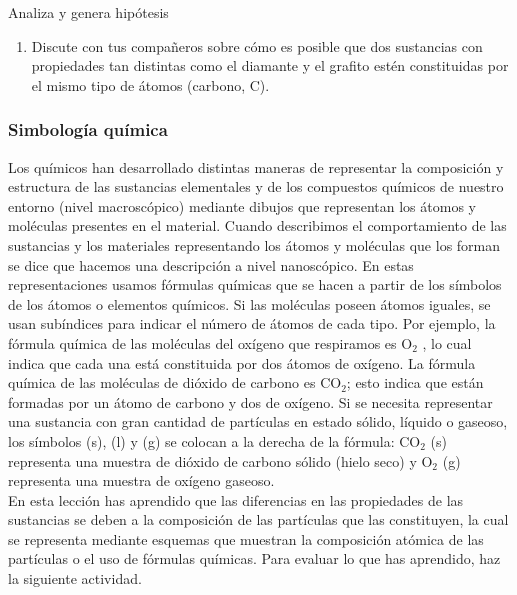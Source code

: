 \documentclass[11pt]{book}
\begin{document}
\begin{boxK}
  Analiza y genera hipótesis
  \begin{enumerate}
    \item Discute con tus compañeros sobre cómo es posible que
          dos sustancias con propiedades tan distintas como el
          diamante y el grafito estén constituidas por el mismo
          tipo de átomos (carbono, C).
  \end{enumerate}
\end{boxK}

\subsubsection{Simbología química}

Los químicos han desarrollado distintas maneras de representar la composición y
estructura de las sustancias elementales y de los compuestos químicos de nuestro
entorno (nivel macroscópico) mediante dibujos que representan los átomos y moléculas presentes en el material.
Cuando describimos el comportamiento de las sustancias
y los materiales representando los átomos y moléculas que los forman se dice que
hacemos una descripción a nivel nanoscópico.
En estas representaciones usamos fórmulas químicas que se hacen a partir de los
símbolos de los átomos o elementos químicos. Si las moléculas poseen átomos iguales,
se usan subíndices para indicar el número de átomos de cada tipo. Por ejemplo, la
fórmula química de las moléculas del oxígeno que respiramos es O$_2$ , lo cual indica que
cada una está constituida por dos átomos de oxígeno. La fórmula química de las moléculas de dióxido de carbono es CO$_2$;
esto indica que están formadas por un átomo de
carbono y dos de oxígeno. Si se necesita representar una sustancia con gran cantidad
de partículas en estado sólido, líquido o gaseoso, los símbolos (s), (l) y (g) se colocan a
la derecha de la fórmula: CO$_2$ (s) representa una muestra de dióxido de carbono sólido
(hielo seco) y O$_2$ (g) representa una muestra de oxígeno gaseoso.\\

En esta lección has aprendido que las diferencias en las propiedades de las sustancias
se deben a la composición de las partículas que las constituyen, la cual se representa
mediante esquemas que muestran la composición atómica de las partículas o el uso
de fórmulas químicas. Para evaluar lo que has aprendido, haz la siguiente actividad.

\newpage
\begin{landscape}
  \thispagestyle{plain}
  \begin{figure}[H]
    \TablaPeriodica[0.48]
    \label{tab:periodic_table}
  \end{figure}
\end{landscape}
\end{document}

